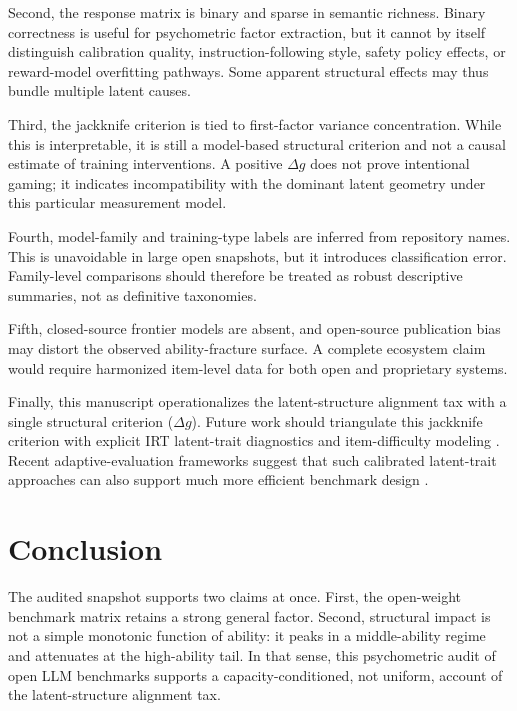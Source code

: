 \documentclass[11pt]{article}
\begin{document}
Second, the response matrix is binary and sparse in semantic richness. Binary correctness is useful for psychometric factor extraction, but it cannot by itself distinguish calibration quality, instruction-following style, safety policy effects, or reward-model overfitting pathways. Some apparent structural effects may thus bundle multiple latent causes.

Third, the jackknife criterion is tied to first-factor variance concentration. While this is interpretable, it is still a model-based structural criterion and not a causal estimate of training interventions. A positive $\Delta g$ does not prove intentional gaming; it indicates incompatibility with the dominant latent geometry under this particular measurement model.

Fourth, model-family and training-type labels are inferred from repository names. This is unavoidable in large open snapshots, but it introduces classification error. Family-level comparisons should therefore be treated as robust descriptive summaries, not as definitive taxonomies.

Fifth, closed-source frontier models are absent, and open-source publication bias may distort the observed ability-fracture surface. A complete ecosystem claim would require harmonized item-level data for both open and proprietary systems.

Finally, this manuscript operationalizes the latent-structure alignment tax with a single structural criterion ($\Delta g$). Future work should triangulate this jackknife criterion with explicit IRT latent-trait diagnostics and item-difficulty modeling \citep{wu2020virt, cai2010highdim, chalmers2012mirt, li2025itemdifficulty, scarlatos2025smart}. Recent adaptive-evaluation frameworks suggest that such calibrated latent-trait approaches can also support much more efficient benchmark design \citep{truong2025amortized, zhou2026lost, li2026adaptive, liao2025legoirt, hofmann2025fluid, krumdick2026abilities, xu2025lart}.

\section{Conclusion}
The audited snapshot supports two claims at once. First, the open-weight benchmark matrix retains a strong general factor. Second, structural impact is not a simple monotonic function of ability: it peaks in a middle-ability regime and attenuates at the high-ability tail. In that sense, this psychometric audit of open LLM benchmarks supports a capacity-conditioned, not uniform, account of the latent-structure alignment tax.



\end{document}

